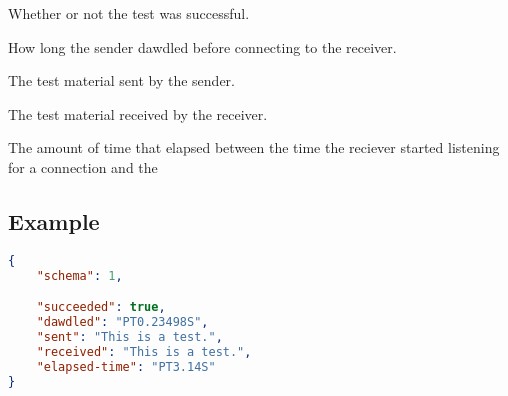 \documentclass[10pt]{article}
\begin{document}
 Whether or not the test was successful.

 How long the sender dawdled before
connecting to the receiver.

 The test material sent by the sender.

 The test material received by the receiver.

 The amount of time that elapsed between
the time the reciever started listening for a connection and the


\subsection{Example}
\begin{lstlisting}[language=json]
{
    "schema": 1,

    "succeeded": true,
    "dawdled": "PT0.23498S",
    "sent": "This is a test.",
    "received": "This is a test.",
    "elapsed-time": "PT3.14S"
}
\end{lstlisting}
\end{document}
